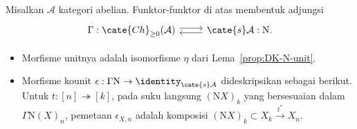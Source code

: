 \begin{lemma}\label{prop:GammaN-adjunction}
	Misalkan $\mathcal{A}$ kategori abelian. Funktor-funktor di atas membentuk
	adjungsi
	\[\begin{tikzcd}
		\Gamma: \cate{Ch}_{\geq 0}(\mathcal{A}) \arrow[shift left, r] & \cate{s}\mathcal{A} : \mathrm{N} \arrow[shift left, l].
	\end{tikzcd}\]
	\begin{itemize}
		\item Morfisme unitnya adalah isomorfisme $\eta$ dari
		Lema~\ref{prop:DK-N-unit}.
		\item Morfisme kounit
		$\epsilon:\Gamma\mathrm{N}\to\identity_{\cate{s}\mathcal{A}}$
		dideskripsikan sebagai berikut. Untuk
		$t:[n]\twoheadrightarrow[k]$, pada suku langsung
		$(\mathrm{N}X)_k$ yang bersesuaian dalam
		$\Gamma\mathrm{N}(X)_n$, pemetaan $\epsilon_{X,n}$ adalah komposisi
		$(\mathrm{N}X)_k\subset X_k\xrightarrow{t^*}X_n$.
	\end{itemize}
\end{lemma}
